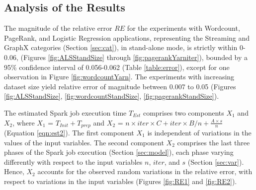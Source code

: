 \documentclass[conference]{IEEEtran}
\begin{document}
\subsection{Analysis of the Results}\label{sec:discussion}
The magnitude of the relative error  $\mathit{RE}$ for the experiments with Wordcount, PageRank, and Logistic Regression
 applications, representing the Streaming and GraphX categories (Section \ref{sec:cat}), in stand-alone mode, is strictly within 0-0.06, (Figures \ref{fig:ALSStandSize} through \ref{fig:pagerankYarniter}), bounded by a 95\% confidence interval  of 0.056-0.062 (Table \ref{table:error}), except for one observation in Figure \ref{fig:wordcountYarn}.   The experiments with increasing dataset size yield relative error of magnitude between 0.007 to 0.05 (Figures \ref{fig:ALSStandSize}, \ref{fig:wordcountStandSize}, \ref{fig:pagerankStandSize}). \par The estimated Spark job execution time $\mathit{T_{\mathit{Est}}}$ comprises two components \emph{$X_1$} and \emph{$X_2$}, where $X_1$ = $\mathit{T_{\mathit{Init}}}  +    \mathit{T_{\mathit{prep}}}$ and $X_2$ = $n \times \mathit{iter} \times C  +   \mathit{iter} \times  B / n + \frac{A \times s}{n}$ (Equation \ref{eqn:est2}). The first component $X_1$ is independent of variations in the values of the input variables. The second component $X_2$ comprises the last three phases of the Spark job execution (Section \ref{sec:model}), each phase varying differently with respect to the input variables $n$, $\mathit{iter}$, and $s$ (Section \ref{sec:var}). Hence, $X_2$ accounts for the observed random variations in the relative error, with respect to variations in the input variables (Figures \ref{fig:RE1} and \ref{fig:RE2}).
\end{document}
